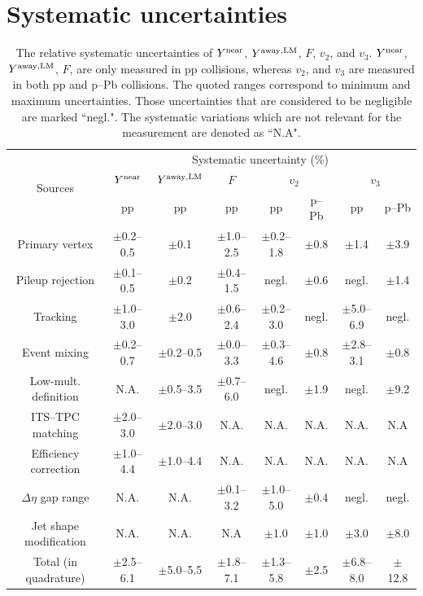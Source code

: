 
\section{Systematic uncertainties}
\label{sec:uncertainties}

\begin{table}[h!]
\caption{The relative systematic uncertainties of $Y^{\rm{near}}$, $Y^{\rm{away,LM}}$, $F$, $v_{2}$, and $v_{3}$. $Y^{\rm{near}}$, $Y^{\rm{away,LM}}$, $F$, are only measured in pp collisions, whereas $v_{2}$, and $v_{3}$ are measured in both pp and p--Pb collisions. The quoted ranges correspond to minimum and maximum uncertainties. Those uncertainties that are considered to be negligible are marked ``negl.". The systematic variations which are not relevant for the measurement are denoted as ``N.A".}
\centering
\label{tab:syst}
\resizebox{\textwidth}{!} {
\begin{tabular}{c|ccc|cccc}
\hline 
\multirow{3}{*}{Sources}  & \multicolumn{7}{c}{Systematic uncertainty (\%)} \\ \cline{2-8} 
& \multicolumn{1}{c}{$Y^{\rm{near}}$} & \multicolumn{1}{c}{$Y^{\rm{away,LM}}$} & \multicolumn{1}{c|}{$F$} & \multicolumn{2}{c}{$v_{2}$} & \multicolumn{2}{c}{$v_{3}$}  \\  \cline{2-8}
&pp &pp &pp & pp & p--Pb & pp & p--Pb  \\ \cline{1-8} 
Primary vertex       & $\pm$0.2--0.5 & $\pm$0.1      & $\pm$1.0--2.5 & $\pm$0.2--1.8 & $\pm$0.8 & $\pm$1.4 & $\pm$3.9 \\ 
Pileup rejection     & $\pm$0.1--0.5 & $\pm$0.2      & $\pm$0.4--1.5 & negl.         & $\pm$0.6 & negl. & $\pm$1.4 \\ 
Tracking		     & $\pm$1.0--3.0 & $\pm$2.0      & $\pm$0.6--2.4 & $\pm$0.2--3.0 & negl. & $\pm$5.0--6.9 & negl. \\ 
Event mixing	     & $\pm$0.2--0.7 & $\pm$0.2--0.5 & $\pm$0.0--3.3 & $\pm$0.3--4.6 & $\pm$0.8 & $\pm$2.8--3.1 & $\pm$0.8 \\ 
Low-mult. definition & N.A.          & $\pm$0.5--3.5 & $\pm$0.7--6.0 & negl.         & $\pm$1.9 & negl. & $\pm$9.2\\ 
ITS--TPC matching 	 & $\pm$2.0--3.0 & $\pm$2.0--3.0 & N.A.          & N.A.          & N.A. & N.A. & N.A\\ 
Efficiency correction& $\pm$1.0--4.4 & $\pm$1.0--4.4 & N.A.          & N.A.          & N.A. & N.A. & N.A\\ 
$\Delta\eta$ gap range   	 & N.A.          & N.A.          & $\pm$0.1--3.2 & $\pm$1.0--5.0 & $\pm$0.4 & negl. & negl. \\ 
Jet shape modification   	 & N.A.          & N.A.          & N.A &  $\pm$1.0& $\pm$1.0 & $\pm$3.0 & $\pm$8.0 \\ 
\hline 
Total (in quadrature)& $\pm$2.5--6.1 & $\pm$5.0--5.5 & $\pm$1.8--7.1 & $\pm$1.3--5.8 & $\pm$2.5 & $\pm$6.8--8.0 & $\pm$12.8 \\ 
\hline 
\end{tabular}
}
\end{table}

